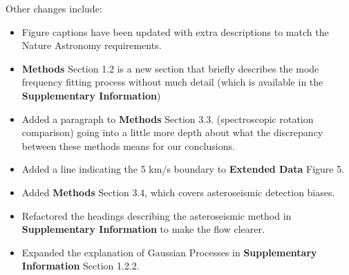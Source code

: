 \documentclass[11pt]{article}
\begin{document}
Other changes include:
\begin{itemize}
	\item Figure captions have been updated with extra descriptions to match the Nature Astronomy requirements.
	\item \textbf{Methods} Section 1.2 is a new section that briefly describes the mode frequency fitting process without much detail (which is available in the \textbf{Supplementary Information})
	\item Added a paragraph to \textbf{Methods} Section 3.3. (spectroscopic rotation comparison) going into a little more depth about what the discrepancy between these methods means for our conclusions.
	\item Added a line indicating the 5 km/s boundary to \textbf{Extended Data} Figure 5.
	\item Added \textbf{Methods} Section 3.4, which covers asteroseismic detection biases.
	\item Refactored the headings describing the asteroseismic method in \textbf{Supplementary Information} to make the flow clearer.
	\item Expanded the explanation of Gaussian Processes in \textbf{Supplementary Information} Section 1.2.2.
\end{itemize}


	
\end{document}
